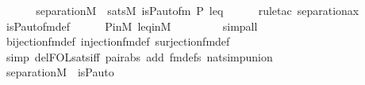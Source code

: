 \begin{isabellebody}
%
\isadelimproof
%
\endisadelimproof
%
\isatagproof
{}\isamarkupfalse%
\ {\isacharminus}{\kern0pt}\ \isanewline
\ \ \isamarkupfalse%
\ {\isachardoublequoteopen}separation{\isacharparenleft}{\kern0pt}{\isacharhash}{\kern0pt}{\isacharhash}{\kern0pt}M{\isacharcomma}{\kern0pt}\ {\isasymlambda}{\isasympi}{\isachardot}{\kern0pt}\ sats{\isacharparenleft}{\kern0pt}M{\isacharcomma}{\kern0pt}\ is{\isacharunderscore}{\kern0pt}P{\isacharunderscore}{\kern0pt}auto{\isacharunderscore}{\kern0pt}fm{\isacharcomma}{\kern0pt}\ {\isacharbrackleft}{\kern0pt}{\isasympi}{\isacharbrackright}{\kern0pt}{\isacharat}{\kern0pt}{\isacharbrackleft}{\kern0pt}P{\isacharcomma}{\kern0pt}\ leq{\isacharbrackright}{\kern0pt}{\isacharparenright}{\kern0pt}{\isacharparenright}{\kern0pt}{\isachardoublequoteclose}\ \isanewline
\ \ \ \ \isamarkupfalse%
{\isacharparenleft}{\kern0pt}rule{\isacharunderscore}{\kern0pt}tac\ separation{\isacharunderscore}{\kern0pt}ax{\isacharparenright}{\kern0pt}\ \isanewline
\ \ \ \ \isamarkupfalse%
\ is{\isacharunderscore}{\kern0pt}P{\isacharunderscore}{\kern0pt}auto{\isacharunderscore}{\kern0pt}fm{\isacharunderscore}{\kern0pt}def\isanewline
\ \ \ \ \isamarkupfalse%
\ P{\isacharunderscore}{\kern0pt}in{\isacharunderscore}{\kern0pt}M\ leq{\isacharunderscore}{\kern0pt}in{\isacharunderscore}{\kern0pt}M\ \isanewline
\ \ \ \ \ \ \isamarkupfalse%
\ simp{\isacharunderscore}{\kern0pt}all\ \isanewline
\ \ \ \ \isamarkupfalse%
\ bijection{\isacharunderscore}{\kern0pt}fm{\isacharunderscore}{\kern0pt}def\ injection{\isacharunderscore}{\kern0pt}fm{\isacharunderscore}{\kern0pt}def\ surjection{\isacharunderscore}{\kern0pt}fm{\isacharunderscore}{\kern0pt}def\ \isanewline
\ \ \ \ \isamarkupfalse%
\ {\isacharparenleft}{\kern0pt}simp\ del{\isacharcolon}{\kern0pt}FOL{\isacharunderscore}{\kern0pt}sats{\isacharunderscore}{\kern0pt}iff\ pair{\isacharunderscore}{\kern0pt}abs\ add{\isacharcolon}{\kern0pt}\ fm{\isacharunderscore}{\kern0pt}defs\ nat{\isacharunderscore}{\kern0pt}simp{\isacharunderscore}{\kern0pt}union{\isacharparenright}{\kern0pt}\ \ \isanewline
\ \ \isamarkupfalse%
\ \isamarkupfalse%
\ {\isachardoublequoteopen}separation{\isacharparenleft}{\kern0pt}{\isacharhash}{\kern0pt}{\isacharhash}{\kern0pt}M{\isacharcomma}{\kern0pt}\ {\isasymlambda}{\isasympi}{\isachardot}{\kern0pt}\ is{\isacharunderscore}{\kern0pt}P{\isacharunderscore}{\kern0pt}auto{\isacharparenleft}{\kern0pt}{\isasympi}{\isacharparenright}{\kern0pt}{\isacharparenright}{\kern0pt}{\isachardoublequoteclose}\isanewline

\end{isabellebody}
